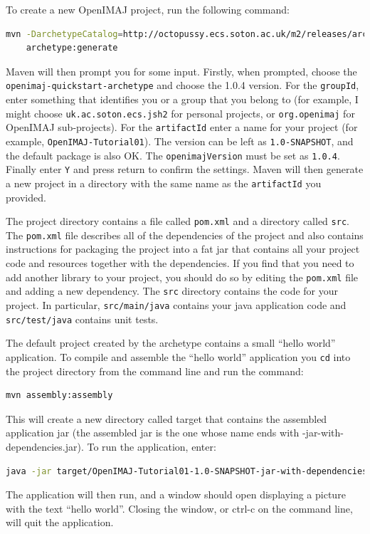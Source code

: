 \documentclass[10pt,a4paper,twoside,extrafontsizes]{memoir}
\begin{document}
To create a new OpenIMAJ project, run the following command:
\begin{lstlisting}[language=bash]
mvn -DarchetypeCatalog=http://octopussy.ecs.soton.ac.uk/m2/releases/archetype-catalog.xml 
	archetype:generate
\end{lstlisting}

Maven will then prompt you for some input.  Firstly, when prompted, choose 
the \texttt{openimaj-quickstart-archetype} and choose the 1.0.4 version. For the \verb+groupId+, 
enter something that identifies you or a group that you belong to (for example, I might choose 
\verb+uk.ac.soton.ecs.jsh2+ for personal projects, or \verb+org.openimaj+ for OpenIMAJ sub-projects). 
For the \verb+artifactId+ enter a name for your project (for example, \verb+OpenIMAJ-Tutorial01+). The 
version can be left as \verb+1.0-SNAPSHOT+, and the default package is also OK. The 
\verb+openimajVersion+ must be set as \verb+1.0.4+. Finally enter \verb+Y+ and press return
to confirm the settings. Maven will then generate a new project in a directory with the same 
name as the \verb+artifactId+ you provided.

The project directory contains a file called \verb+pom.xml+ and a directory called \verb+src+. 
The \verb+pom.xml+ file describes all of the dependencies of the project and also contains 
instructions for packaging the project into a fat jar that contains all your project code and 
resources together with the dependencies. If you find that you need to add another library to 
your project, you should do so by editing the \verb+pom.xml+ file and adding a new dependency. 
The \verb+src+ directory contains the code for your project. In particular, \verb+src/main/java+ 
contains your java application code and \verb+src/test/java+ contains unit tests.

The default project created by the archetype contains a small ``hello world'' application. To 
compile and assemble the ``hello world'' application you \verb+cd+ into the project directory 
from the command line and run the command:
\begin{lstlisting}[language=bash]
mvn assembly:assembly
\end{lstlisting}
This will create a new directory called target that contains the assembled application jar 
(the assembled jar is the one whose name ends with -jar-with-dependencies.jar). To run the 
application, enter:
\begin{lstlisting}[language=bash]
java -jar target/OpenIMAJ-Tutorial01-1.0-SNAPSHOT-jar-with-dependencies.jar
\end{lstlisting}
The application will then run, and a window should open displaying a picture with the text 
``hello world''. Closing the window, or ctrl-c on the command line, will quit the application.
\end{document}
